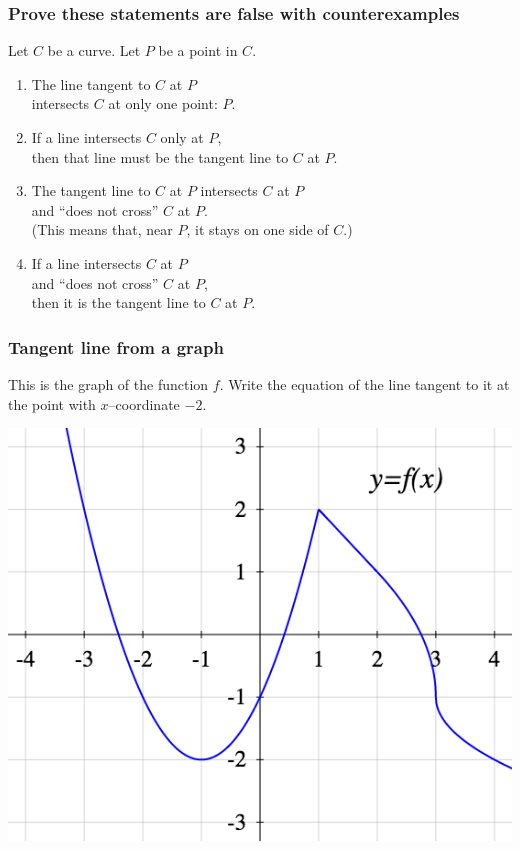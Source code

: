 \documentclass[14pt]{beamer}
\begin{document}
\begin{frame}
	\frametitle{Prove these statements are false with counterexamples}

	Let $C$ be a curve. Let $P$ be a point in $C$.
	\vfill
	\begin{enumerate}
		\item The line tangent to $C$ at $P$ \\ intersects $C$ at only one point:
			$P$.
			\vfill

		\item If a line intersects $C$ only at $P$, \\ then that line must be the
			tangent line to $C$ at $P$.
			\vfill

		\item The tangent line to $C$ at $P$ intersects $C$ at $P$ \\ and ``does not
			cross'' $C$ at $P$. \\ (This means that, near $P$, it stays on one side of
			$C$.)
			\vfill

		\item If a line intersects $C$ at $P$ \\ and ``does not cross'' $C$ at $P$,
			\\ then it is the tangent line to $C$ at $P$.
			\vfill
	\end{enumerate}
\end{frame}

\begin{frame}[t]
	\frametitle{Tangent line from a graph}
	This is the graph of the function $f$. Write the equation of the line tangent
	to it at the point with $x$--coordinate $-2$.
	\begin{center}
		\includegraphics[scale=.4]{G4}
	\end{center}
\end{frame}
\end{document}
